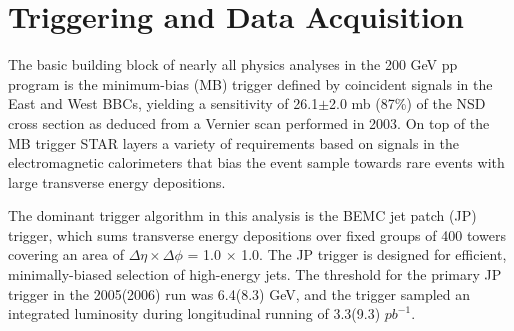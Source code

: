 \section{Triggering and Data Acquisition}

The basic building block of nearly all physics analyses in the 200 GeV pp
program is the minimum-bias (MB) trigger defined by coincident signals in the
East and West BBCs, yielding a sensitivity of 26.1$\pm$2.0 mb (87\%) of the
NSD cross section as deduced from a Vernier scan performed in 2003. On top of
the MB trigger STAR layers a variety of requirements based on signals in the
electromagnetic calorimeters that bias the event sample towards rare events
with large transverse energy depositions.

The dominant trigger algorithm in this analysis is the BEMC jet patch (JP)
trigger, which sums transverse energy depositions over fixed groups of 400
towers covering an area of $\Delta \eta \times \Delta \phi$ = 1.0 $\times$
1.0. The JP trigger is designed for efficient, minimally-biased selection of
high-energy jets. The threshold for the primary JP trigger in the 2005(2006)
run was 6.4(8.3) GeV, and the trigger sampled an integrated luminosity during
longitudinal running of 3.3(9.3) $pb^{-1}$.







